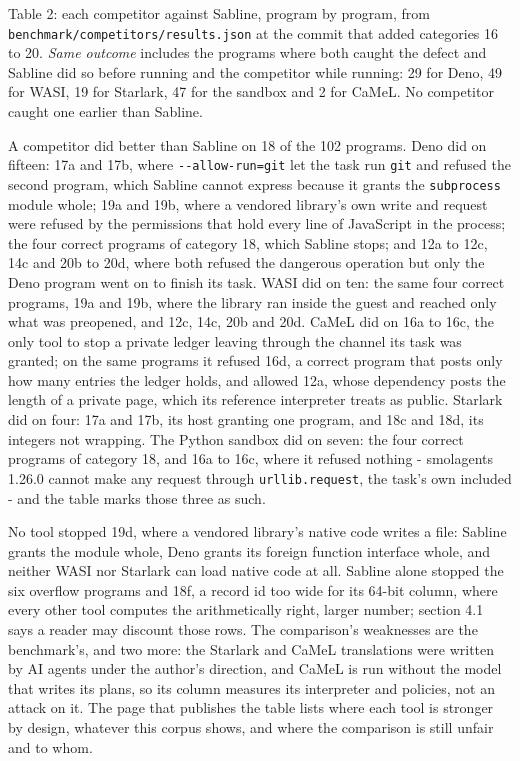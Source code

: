 \documentclass[
]{article}
\begin{document}
Table 2: each competitor against Sabline, program by program, from
\texttt{benchmark/competitors/results.json} at the commit that added
categories 16 to 20. \emph{Same outcome} includes the programs where
both caught the defect and Sabline did so before running and the
competitor while running: 29 for Deno, 49 for WASI, 19 for Starlark, 47
for the sandbox and 2 for CaMeL. No competitor caught one earlier than
Sabline.

A competitor did better than Sabline on 18 of the 102 programs. Deno did
on fifteen: 17a and 17b, where \texttt{-\/-allow-run=git} let the task
run \texttt{git} and refused the second program, which Sabline cannot
express because it grants the \texttt{subprocess} module whole; 19a and
19b, where a vendored library's own write and request were refused by
the permissions that hold every line of JavaScript in the process; the
four correct programs of category 18, which Sabline stops; and 12a to
12c, 14c and 20b to 20d, where both refused the dangerous operation but
only the Deno program went on to finish its task. WASI did on ten: the
same four correct programs, 19a and 19b, where the library ran inside
the guest and reached only what was preopened, and 12c, 14c, 20b and
20d. CaMeL did on 16a to 16c, the only tool to stop a private ledger
leaving through the channel its task was granted; on the same programs
it refused 16d, a correct program that posts only how many entries the
ledger holds, and allowed 12a, whose dependency posts the length of a
private page, which its reference interpreter treats as public. Starlark
did on four: 17a and 17b, its host granting one program, and 18c and
18d, its integers not wrapping. The Python sandbox did on seven: the
four correct programs of category 18, and 16a to 16c, where it refused
nothing - smolagents 1.26.0 cannot make any request through
\texttt{urllib.request}, the task's own included - and the table marks
those three as such.

No tool stopped 19d, where a vendored library's native code writes a
file: Sabline grants the module whole, Deno grants its foreign function
interface whole, and neither WASI nor Starlark can load native code at
all. Sabline alone stopped the six overflow programs and 18f, a record
id too wide for its 64-bit column, where every other tool computes the
arithmetically right, larger number; section 4.1 says a reader may
discount those rows. The comparison's weaknesses are the benchmark's,
and two more: the Starlark and CaMeL translations were written by AI
agents under the author's direction, and CaMeL is run without the model
that writes its plans, so its column measures its interpreter and
policies, not an attack on it. The page that publishes the table lists
where each tool is stronger by design, whatever this corpus shows, and
where the comparison is still unfair and to whom.
\end{document}
